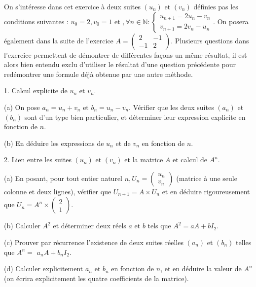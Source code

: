 \documentclass[a4paper, 11pt,reqno]{article}
\begin{document}
\begin{exercice}

On s'intéresse dans cet exercice à deux suites $\left(u_{n}\right)$ et $\left(v_{n}\right)$ définies pas les conditions suivantes : $u_{0}=2, v_{0}=1$ et $, \forall n \in \mathbb{N}:\left\{\begin{array}{l}u_{n+1}=2 u_{n}-v_{n} \\ v_{n+1}=2 v_{n}-u_{n}\end{array} .\right.$ On posera également dans la suite de l'exercice $A=\left(\begin{array}{cc}2 & -1 \\ -1 & 2\end{array}\right)$. Plusieurs questions dans l'exercice permettent de démontrer de différentes façons un même résultat, il est alors bien entendu exclu d'utiliser le résultat d'une question précédente pour redémontrer une formule déjà obtenue par une autre méthode.

1. Calcul explicite de $u_{n}$ et $v_{n}$.

(a) On pose $a_{n}=u_{n}+v_{n}$ et $b_{n}=u_{n}-v_{n}$. Vérifier que les deux suites $\left(a_{n}\right)$ et $\left(b_{n}\right)$ sont d'un type bien particulier, et déterminer leur expression explicite en fonction de $n$.

(b) En déduire les expressions de $u_{n}$ et de $v_{n}$ en fonction de $n$.

2. Lien entre les suites $\left(u_{n}\right)$ et $\left(v_{n}\right)$ et la matrice $A$ et calcul de $A^{n}$.

(a) En posant, pour tout entier naturel $n, U_{n}=\left(\begin{array}{c}u_{n} \\ v_{n}\end{array}\right)$ (matrice à une seule colonne et deux lignes), vérifier que $U_{n+1}=A \times U_{n}$ et en déduire rigoureusement que $U_{n}=A^{n} \times\left(\begin{array}{c}2 \\ 1\end{array}\right)$.

(b) Calculer $A^{2}$ et déterminer deux réels $a$ et $b$ tels que $A^{2}=a A+b I_{2}$.

(c) Prouver par récurrence l'existence de deux suites réelles $\left(a_{n}\right)$ et $\left(b_{n}\right)$ telles que $A^{n}=$ $a_{n} A+b_{n} I_{2}$.

(d) Calculer explicitement $a_{n}$ et $b_{n}$ en fonction de $n$, et en déduire la valeur de $A^{n}$ (on écrira explicitement les quatre coefficients de la matrice).


\end{exercice}
\end{document}
